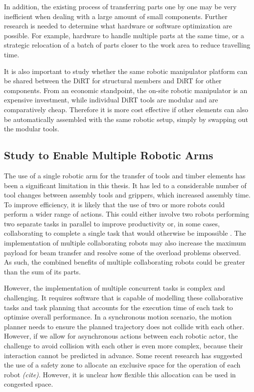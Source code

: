 In addition, the existing process of transferring parts one by one may be very inefficient when dealing with a large amount of small components. Further research is needed to determine what hardware or software optimization are possible. For example, hardware to handle multiple parts at the same time, or a strategic relocation of a batch of parts closer to the work area to reduce travelling time. 

It is also important to study whether the same robotic manipulator platform can be shared between the DiRT for structural members and DiRT for other components. From an economic standpoint, the on-site robotic manipulator is an expensive investment, while individual DiRT tools are modular and are comparatively cheap. Therefore it is more cost effective if other elements can also be automatically assembled with the same robotic setup, simply by swapping out the modular tools.

\subsection{Study to Enable Multiple Robotic Arms}
\label{subsection:study_to_enable_multiple_robots
}
The use of a single robotic arm for the transfer of tools and timber elements has been a significant limitation in this thesis. It has led to a considerable number of tool changes between assembly tools and grippers, which increased assembly time. To improve efficiency, it is likely that the use of two or more robots could perform a wider range of actions. This could either involve two robots performing two separate tasks in parallel to improve productivity or, in some cases, collaborating to complete a single task that would otherwise be impossible . The implementation of multiple collaborating robots may also increase the maximum payload for beam transfer and resolve some of the overload problems observed. As such, the combined benefits of multiple collaborating robots could be greater than the sum of its parts.

However, the implementation of multiple concurrent tasks is complex and challenging. It requires software that is capable of modelling these collaborative tasks and task planning that accounts for the execution time of each task to optimise overall performance. In a synchronous motion scenario, the motion planner needs to ensure the planned trajectory does not collide with each other. However, if we allow for asynchronous actions between each robotic actor, the challenge to avoid collision with each other is even more complex, because their interaction cannot be predicted in advance. Some recent research has suggested the use of a safety zone to allocate an exclusive space for the operation of each robot \textit{(cite)}. However, it is unclear how flexible this allocation can be used in congested space.

